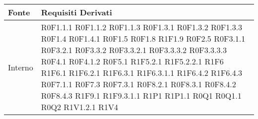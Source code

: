 	\begin{center}

	\def\arraystretch{1.5}
	\bgroup
	\begin{longtable}{| p{4cm} | p{4cm} |}

		\hline
		\textbf{Fonte} & \textbf{Requisiti Derivati} \\
		\hline

		Interno  &  R0F1.1.1 \newline R0F1.1.2 \newline R0F1.1.3 \newline R0F1.3.1 \newline R0F1.3.2 \newline R0F1.3.3 \newline R0F1.4 \newline R0F1.4.1 \newline R0F1.5 \newline R0F1.8 \newline R1F1.9 \newline R0F2.5 \newline R0F3.1.1 \newline R0F3.2.1 \newline R0F3.3.2 \newline R0F3.3.2.1 \newline R0F3.3.3.2 \newline R0F3.3.3.3 \newline R0F4.1 \newline R0F4.1.2 \newline R0F5.1 \newline R1F5.2.1 \newline R1F5.2.2.1 \newline R1F6 \newline R1F6.1 \newline R1F6.2.1 \newline R1F6.3.1 \newline R1F6.3.1.1 \newline R1F6.4.2 \newline R1F6.4.3 \newline R0F7.1.1 \newline R0F7.3 \newline R0F7.3.1 \newline R0F8.2.1 \newline R0F8.3.1 \newline R0F8.4.2 \newline R0F8.4.3 \newline R1F9.1 \newline R1F9.3.1.1 \newline R1P1 \newline R1P1.1 \newline R0Q1 \newline R0Q1.1 \newline R0Q2 \newline R1V1.2.1 \newline R1V4 \\

\end{longtable}
\end{center}
